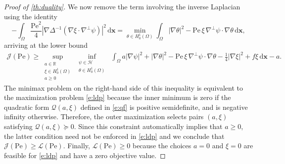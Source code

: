 \documentclass[10pt,a4paper]{amsart}
\newcommand{\Pe}{\mathrm{Pe}}
\newcommand{\QF}{\mathcal{Q}}
\newcommand{\R}{\mathbb{R}}
\newcommand{\abs}[1]{\left\vert #1 \right\vert}
\newcommand{\avg}[1]{\int_\Omega #1 \,\dx}
\newcommand{\cal}[1]{\mathcal{#1}}
\newcommand{\dx}{\mathrm{d} \vec{x}}
\newcommand{\invlap}{\Delta^{-1}}
\newcommand{\lb}{\mathcal{L}}
\newcommand{\ocpval}{\mathcal{J}}
\renewcommand{\vec}[1]{\mathbf{#1}}
\begin{document}
\begin{proof}[Proof of \cref{th:duality}]
    We now remove the term involving the inverse Laplacian using the identity 
    \begin{equation*}
        -\avg{ \frac{\Pe^2}{4} \abs{\nabla \invlap(\nabla \xi \cdot \nabla^\perp \psi)}^2 } = \min_{\theta \in H^1_0(\Omega)} \avg{ \abs{\nabla\theta}^2 - \Pe\,\xi\,\nabla^\perp \psi \cdot \nabla\theta },
    \end{equation*}
    arriving at the lower bound
    \begin{align*}
        \ocpval(\Pe)
        \geq 
        \sup_{\substack{a \in \R \\ \xi \in H^1_0(\Omega) \\ a\geq 0}}
        \inf_{\substack{ %
        \psi \in \cal{H} \\ 
        \theta \in H^1_0(\Omega)
        }}\; %
        \avg{a\abs{\nabla\psi}^2 + \abs{\nabla\theta}^2 - \Pe\,\xi\,\nabla^\perp\psi \cdot \nabla\theta - \frac14 \abs{\nabla \xi}^2 + f\xi} - a.
    \end{align*}
    The minimax problem on the right-hand side of this inequality is equivalent to the maximization problem \cref{e:ldp} because the inner minimum is zero if the quadratic form $\QF(a,\xi)$ defined in \cref{e:qf} is positive semidefinite, and is negative infinity otherwise. Therefore, the outer maximization selects pairs $(a,\xi)$ satisfying $\QF(a,\xi)\succeq 0$. Since this constraint automatically implies that $a\geq 0$, the latter condition need not be enforced in \cref{e:ldp} and we conclude that $\ocpval(\Pe) \geq \lb(\Pe)$. Finally, $\lb(\Pe)\geq 0$ because the choices $a=0$ and $\xi=0$ are feasible for \cref{e:ldp} and have a zero objective value.
\end{proof}
\end{document}
